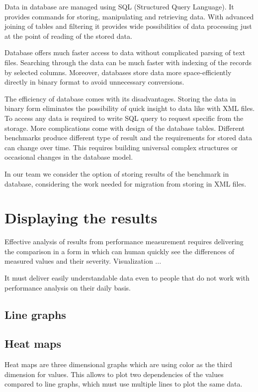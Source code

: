 Data in database are managed using SQL (Structured Query Language). It provides
commands for storing, manipulating and retrieving data. With advanced joining of
tables and filtering it provides wide possibilities of data processing just at
the point of reading of the stored data.

Database offers much faster access to data without complicated parsing of text
files. Searching through the data can be much faster with indexing of the
records by selected columns. Moreover, databases store data more
space-efficiently directly in binary format to avoid unnecessary conversions.

The efficiency of database comes with its disadvantages. 
Storing the data in binary form eliminates the possibility of quick insight to
data like with XML files. To access any data is required to write SQL query to
request specific from the storage.
More complications come with design of the database tables. Different benchmarks
produce different type of result and the requirements for stored data can change
over time. This requires building universal complex structures or occasional
changes in the database model.

In our team we consider the option of storing results of the benchmark in
database, considering the work needed for migration from storing in XML files.



\chapter{Displaying the results} \label{ch:visualization}
Effective analysis of results from performance measurement requires delivering
the comparison in a form in which can human quickly see the differences of
measured values and their severity. Visualization ...

It must deliver easily understandable data even to people that do not work with
performance analysis on their daily basis.

\section{Line graphs}

\section{Heat maps}
Heat maps are three dimensional graphs which are using color as the third
dimension for values. This allows to plot two dependencies of the values
compared to line graphs, which must use multiple lines to plot the same data.


